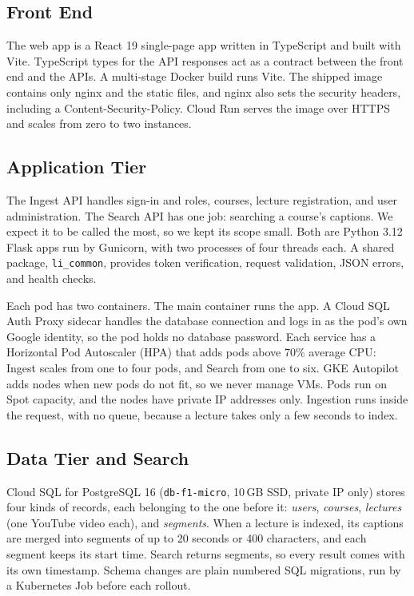 \documentclass[conference]{IEEEtran}
\begin{document}
\subsection{Front End}
The web app is a React 19 single-page app written in TypeScript and built
with Vite. TypeScript types for the API responses act as a contract
between the front end and the APIs. A multi-stage Docker build runs Vite.
The shipped image contains only nginx and the static files, and nginx also
sets the security headers, including a Content-Security-Policy. Cloud Run
serves the image over HTTPS and scales from zero to two instances.

\subsection{Application Tier}
The Ingest API handles sign-in and roles, courses, lecture registration,
and user administration. The Search API has one job: searching a course's
captions. We expect it to be called the most, so we kept its scope small.
Both are Python 3.12 Flask apps run by Gunicorn, with two processes of four
threads each. A shared package, \texttt{li\_common}, provides token
verification, request validation, JSON errors, and health checks.

Each pod has two containers. The main container runs the app. A Cloud SQL
Auth Proxy sidecar handles the database connection and logs in as the
pod's own Google identity, so the pod holds no database password. Each
service has a Horizontal Pod Autoscaler (HPA) that adds pods above 70\%
average CPU: Ingest scales from one to four pods, and Search from one to
six. GKE Autopilot adds nodes when new pods do not fit, so we never manage
VMs. Pods run on Spot capacity, and the nodes have private IP addresses
only. Ingestion runs inside the request, with no queue, because a lecture
takes only a few seconds to index.

\subsection{Data Tier and Search}
Cloud SQL for PostgreSQL 16 (\texttt{db-f1-micro}, 10\,GB SSD, private IP
only) stores four kinds of records, each belonging to the one before it:
\emph{users}, \emph{courses}, \emph{lectures} (one YouTube video each),
and \emph{segments}. When a lecture is indexed, its captions are merged
into segments of up to 20 seconds or 400 characters, and each segment
keeps its start time. Search returns segments, so every result comes with
its own timestamp. Schema changes are plain numbered SQL migrations, run
by a Kubernetes Job before each rollout.
\end{document}
